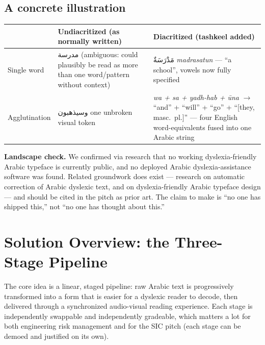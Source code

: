\documentclass[11pt,a4paper]{article}
\begin{document}
\subsection{A concrete illustration}

\begin{center}
\begin{tabular}{@{}p{3.6cm}p{5.4cm}p{5.4cm}@{}}
\toprule
& \textbf{Undiacritized (as normally written)} & \textbf{Diacritized (tashkeel added)} \\
\midrule
Single word &
{\Large\textarabic{مدرسة}} \newline (ambiguous: could plausibly be read as more than one word/pattern without context) &
{\Large\textarabic{مَدْرَسَةٌ}} \newline \emph{madrasatun} --- ``a school'', vowels now fully specified \\
\addlinespace
Agglutination &
{\Large\textarabic{وسيذهبون}} \newline one unbroken visual token &
\textit{wa + sa + yadh-hab + \=una} $\rightarrow$ ``and'' + ``will'' + ``go'' + ``[they, masc.\ pl.]'' --- four English word-equivalents fused into one Arabic string \\
\bottomrule
\end{tabular}
\end{center}

\begin{noteb}
\textbf{Landscape check.} We confirmed via research that no working
dyslexia-friendly Arabic typeface is currently public, and no deployed Arabic
dyslexia-assistance software was found. Related groundwork does exist ---
research on automatic correction of Arabic dyslexic text, and on dyslexia-friendly
Arabic typeface design --- and should be cited in the pitch as prior art. The
claim to make is ``no one has shipped this,'' not ``no one has thought about
this.''
\end{noteb}

\section{Solution Overview: the Three-Stage Pipeline}

The core idea is a linear, staged pipeline: raw Arabic text is progressively
transformed into a form that is easier for a dyslexic reader to decode, then
delivered through a synchronized audio-visual reading experience. Each stage is
independently swappable and independently gradeable, which matters a lot for both
engineering risk management and for the SIC pitch (each stage can be demoed and
justified on its own).
\end{document}
